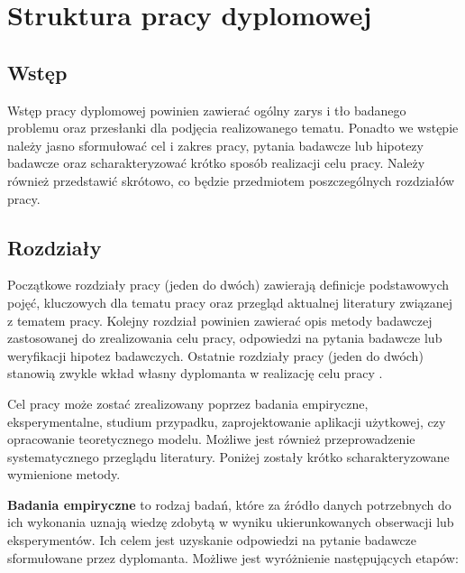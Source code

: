 \chapter{Struktura pracy dyplomowej}
\label{chap:drugi}



\section{Wstęp}

Wstęp pracy dyplomowej powinien zawierać ogólny zarys i tło badanego problemu oraz przesłanki dla podjęcia realizowanego tematu. Ponadto we wstępie należy jasno sformułować cel i zakres pracy, pytania badawcze lub hipotezy badawcze oraz scharakteryzować krótko sposób realizacji celu pracy. Należy również przedstawić skrótowo, co będzie przedmiotem poszczególnych rozdziałów pracy.


\section{Rozdziały}
 Początkowe rozdziały pracy (jeden do dwóch) zawierają definicje podstawowych pojęć, kluczowych dla tematu pracy oraz przegląd aktualnej literatury związanej z tematem pracy.
 Kolejny rozdział powinien zawierać opis metody badawczej zastosowanej do zrealizowania celu pracy, odpowiedzi na pytania badawcze lub weryfikacji hipotez badawczych. Ostatnie rozdziały pracy (jeden do dwóch) stanowią zwykle wkład własny dyplomanta w realizację celu pracy \citep{blazejewskiSzal}.

Cel pracy może zostać zrealizowany poprzez  badania empiryczne, eksperymentalne, studium przypadku, zaprojektowanie aplikacji użytkowej, czy opracowanie teoretycznego modelu. Możliwe jest również przeprowadzenie systematycznego przeglądu literatury. Poniżej zostały krótko scharakteryzowane wymienione metody.

\textbf{Badania empiryczne} to rodzaj badań, które za źródło danych potrzebnych do ich wykonania uznają wiedzę zdobytą w wyniku ukierunkowanych obserwacji lub eksperymentów. Ich celem jest uzyskanie odpowiedzi na pytanie badawcze sformułowane przez dyplomanta. Możliwe jest wyróżnienie następujących etapów:


